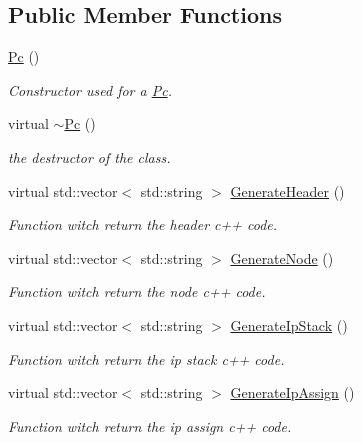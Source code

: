 \subsection*{Public Member Functions}
\begin{CompactItemize}
\item 
\hyperlink{class_pc_ef7314496cee3c1bd2c329aac4dc4f21}{Pc} ()
\begin{CompactList}\small\item\em Constructor used for a \hyperlink{class_pc}{Pc}. \item\end{CompactList}\item 
virtual \hyperlink{class_pc_b15cb9b9bfb8a9d9ff964091e1a63cec}{$\sim$Pc} ()
\begin{CompactList}\small\item\em the destructor of the class. \item\end{CompactList}\item 
virtual std::vector$<$ std::string $>$ \hyperlink{class_pc_ca543f3f579e2531dfbe70a8ae419915}{GenerateHeader} ()
\begin{CompactList}\small\item\em Function witch return the header c++ code. \item\end{CompactList}\item 
virtual std::vector$<$ std::string $>$ \hyperlink{class_pc_27e33b70f680c5fa0c947415c6d0a77f}{GenerateNode} ()
\begin{CompactList}\small\item\em Function witch return the node c++ code. \item\end{CompactList}\item 
virtual std::vector$<$ std::string $>$ \hyperlink{class_pc_1457375fb9f19d9a0270a26a8ec7b7b6}{GenerateIpStack} ()
\begin{CompactList}\small\item\em Function witch return the ip stack c++ code. \item\end{CompactList}\item 
virtual std::vector$<$ std::string $>$ \hyperlink{class_pc_3f50cc66c3e268c95b2d2b4b7f8c1246}{GenerateIpAssign} ()
\begin{CompactList}\small\item\em Function witch return the ip assign c++ code. \item\end{CompactList}\end{CompactItemize}


